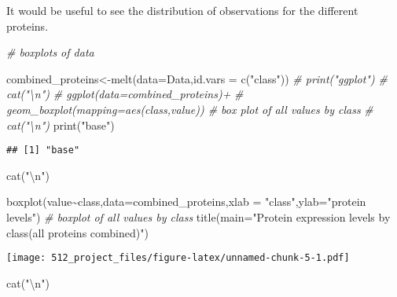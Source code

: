 \documentclass[
]{article}
\newenvironment{Shaded}{\begin{snugshade}}{\end{snugshade}}
\newcommand{\AttributeTok}[1]{\textcolor[rgb]{0.77,0.63,0.00}{#1}}
\newcommand{\CommentTok}[1]{\textcolor[rgb]{0.56,0.35,0.01}{\textit{#1}}}
\newcommand{\FunctionTok}[1]{\textcolor[rgb]{0.00,0.00,0.00}{#1}}
\newcommand{\NormalTok}[1]{#1}
\newcommand{\OtherTok}[1]{\textcolor[rgb]{0.56,0.35,0.01}{#1}}
\newcommand{\SpecialCharTok}[1]{\textcolor[rgb]{0.00,0.00,0.00}{#1}}
\newcommand{\StringTok}[1]{\textcolor[rgb]{0.31,0.60,0.02}{#1}}
\begin{document}
It would be useful to see the distribution of observations for the
different proteins.

\begin{Shaded}
\begin{Highlighting}[]
\CommentTok{\# boxplots of data}

\NormalTok{combined\_proteins}\OtherTok{\textless{}{-}}\FunctionTok{melt}\NormalTok{(}\AttributeTok{data=}\NormalTok{Data,}\AttributeTok{id.vars =} \FunctionTok{c}\NormalTok{(}\StringTok{"class"}\NormalTok{))}
\CommentTok{\# print("ggplot")}
\CommentTok{\# cat("\textbackslash{}n")}
\CommentTok{\# ggplot(data=combined\_proteins)+}
\CommentTok{\#   geom\_boxplot(mapping=aes(class,value)) \# box plot of all values by class}
\CommentTok{\# cat("\textbackslash{}n")}
\FunctionTok{print}\NormalTok{(}\StringTok{"base"}\NormalTok{)}
\end{Highlighting}
\end{Shaded}

\begin{verbatim}
## [1] "base"
\end{verbatim}

\begin{Shaded}
\begin{Highlighting}[]
\FunctionTok{cat}\NormalTok{(}\StringTok{"}\SpecialCharTok{\textbackslash{}n}\StringTok{"}\NormalTok{)}
\end{Highlighting}
\end{Shaded}

\begin{Shaded}
\begin{Highlighting}[]
\FunctionTok{boxplot}\NormalTok{(value}\SpecialCharTok{\textasciitilde{}}\NormalTok{class,}\AttributeTok{data=}\NormalTok{combined\_proteins,}\AttributeTok{xlab =} \StringTok{"class"}\NormalTok{,}\AttributeTok{ylab=}\StringTok{"protein levels"}\NormalTok{) }\CommentTok{\# boxplot of all values by class}
\FunctionTok{title}\NormalTok{(}\AttributeTok{main=}\StringTok{"Protein expression levels by class(all proteins combined)"}\NormalTok{)}
\end{Highlighting}
\end{Shaded}

\texttt{[image: 512\_project\_files/figure-latex/unnamed-chunk-5-1.pdf]}

\begin{Shaded}
\begin{Highlighting}[]
\FunctionTok{cat}\NormalTok{(}\StringTok{"}\SpecialCharTok{\textbackslash{}n}\StringTok{"}\NormalTok{)}
\end{Highlighting}
\end{Shaded}
\end{document}
